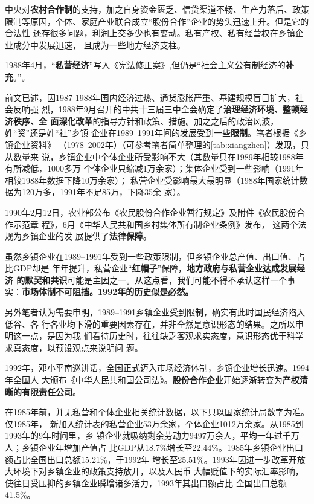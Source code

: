 中央对\textbf{农村合作制}的支持，加之自身资金匮乏、信贷渠道不畅、生产力落后、政策
限制等原因，个体、家庭产业联合成立“股份合作”企业的势头迅速上升。但是它的合法性
还存很多问题，利润上交多少也有变动。私有产权、私有经营权在乡镇企业成分中发展迅速，
且成为一些地方经济支柱。

1988年4月，“\textbf{私营经济}”写入《宪法修正案》,但仍是“社会主义公有制经济的\textbf{补
充}。”。

前文已述，因1987-1988年国内经济过热、通货膨胀严重、基建规模盲目扩大，社会反响强
烈，1988年9月召开的中共十三届三中全会确定了\textbf{治理经济环境、整顿经济秩序、全
  面深化改革}的指导方针和政策、措施。加之之后的政治风波，姓“资”还是姓“社”乡镇
企业在1989--1991年间的发展受到一些\textbf{限制}。笔者根据《乡镇企业资料》
（1978--2002年）（可参考笔者简单整理的\cref{tab:xiangzhen}）发现，只从数量来
说，乡镇企业中个体企业所受影响不大（其数量只在1989年相较1988年有所减低，1000多万
个体企业只缩减1万余家）；集体企业受到一些影响（1991年相较1988年数据下降10万余家）；
私营企业受影响最大最明显（1988年国家统计数据为120万多，1991年不足85万，下降35余
家）。

1990年2月12日，农业部公布《农民股份合作企业暂行规定》及附件《农民股份合作示范章
程》，6月《中华人民共和国乡村集体所有制企业条例》发布， 这两个法规为乡镇企业的发
展提供了\textbf{法律保障}。

虽然乡镇企业在1989--1991年受到一些政策限制，但乡镇企业总产值、出口值、占比GDP却是
年年提升，私营企业“\textbf{红帽子}”保障，\textbf{地方政府与私营企业达成发展经济
  的默契和共识}可能是主因之一。从这点看，我们可能不得不承认这样一个事
实：\textbf{市场体制不可阻挡。1992年的历史似是必然。}

另外笔者认为需要申明，1989--1991乡镇企业受到限制，确实有此时国民经济陷入低谷、各
行各业均下滑的重要因素存在，并非全然是意识形态的结果。之所以申明这一点，是因为我
们看待历史时，往往缺乏客观求实态度，意识形态优于科学求真态度，以预设观点来说明问
题。

1992年，邓小平南巡讲话，全国正式迈入市场经济体制，乡镇企业增长迅速。1994年全国人
大颁布《中华人民共和国公司法》。\textbf{股份合作企业}开始逐渐转变为\textbf{产权清
  晰的有限责任公司}。

在1985年前，并无私营和个体企业相关统计数据，以下只以国家统计局数字为准。仅1985年，
新加入统计表的私营企业53万余家，个体企业1012万余家。从1985到1993年的9年时间里，乡
镇企业就吸纳剩余劳动力9497万余人，平均一年过千万人；乡镇企业年增加产值占
比GDP从18.7\%增长至22.44\%。1985年乡镇企业出口额占比全国出口总额15.21\%，于1992年
增长至25.51\%。1993年因进一步改革开放大环境下对乡镇企业的政策支持放开，以及人民币
大幅贬值下的实际汇率影响，使往日受压抑的乡镇企业瞬增诸多活力，1993年其出口额占比
全国出口总额41.5\%。

